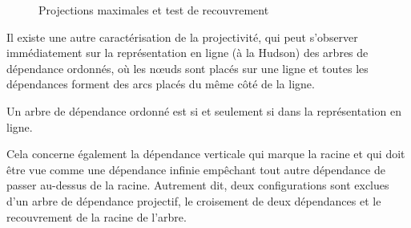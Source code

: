 \begin{figure}
\caption{\label{fig:ABproj}Projections maximales et test de recouvrement}
\end{figure}


Il existe une autre caractérisation de la projectivité, qui peut s’observer immédiatement sur la représentation en ligne (à la Hudson) des arbres de dépendance ordonnés, où les nœuds sont placés sur une ligne et toutes les dépendances forment des arcs placés du même côté de la ligne.

{Un arbre de dépendance ordonné est  si et seulement si  dans la représentation en ligne.}

Cela concerne également la dépendance verticale qui marque la racine et qui doit être vue comme une dépendance infinie empêchant tout autre dépendance de passer au-dessus de la racine. Autrement dit,  deux configurations sont exclues d’un arbre de dépendance projectif, le croisement de deux dépendances et le recouvrement de la racine de l'arbre.

